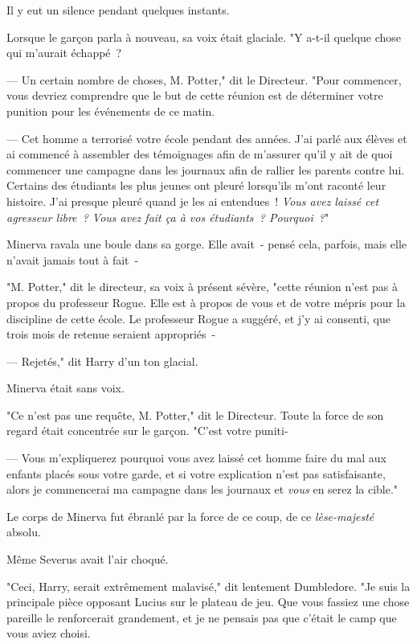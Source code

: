 Il y eut un silence pendant quelques instants.

Lorsque le garçon parla à nouveau, sa voix était glaciale. "Y a-t-il quelque chose qui m'aurait échappé~?

--- Un certain nombre de choses, M. Potter," dit le Directeur. "Pour commencer, vous devriez comprendre que le but de cette réunion est de déterminer votre punition pour les événements de ce matin.

--- Cet homme a terrorisé votre école pendant des années. J'ai parlé aux élèves et ai commencé à assembler des témoignages afin de m'assurer qu'il y ait de quoi commencer une campagne dans les journaux afin de rallier les parents contre lui. Certains des étudiants les plus jeunes ont pleuré lorsqu'ils m'ont raconté leur histoire. J'ai presque pleuré quand je les ai entendues~! \emph{Vous avez laissé cet agresseur libre~? Vous avez fait ça à vos étudiants~? Pourquoi~?}"

Minerva ravala une boule dans sa gorge. Elle avait~- pensé cela, parfois, mais elle n'avait jamais tout à fait~-

"M. Potter," dit le directeur, sa voix à présent sévère, "cette réunion n'est pas à propos du professeur Rogue. Elle est à propos de vous et de votre mépris pour la discipline de cette école. Le professeur Rogue a suggéré, et j'y ai consenti, que trois mois de retenue seraient appropriés~-

--- Rejetés," dit Harry d'un ton glacial.

Minerva était sans voix.

"Ce n'est pas une requête, M. Potter," dit le Directeur. Toute la force de son regard était concentrée sur le garçon. "C'est votre puniti-

--- Vous m'expliquerez pourquoi vous avez laissé cet homme faire du mal aux enfants placés sous votre garde, et si votre explication n'est pas satisfaisante, alors je commencerai ma campagne dans les journaux et \emph{vous} en serez la cible."

Le corps de Minerva fut ébranlé par la force de ce coup, de ce \emph{lèse-majesté} absolu.

Même Severus avait l'air choqué.

"Ceci, Harry, serait extrêmement malavisé," dit lentement Dumbledore. "Je suis la principale pièce opposant Lucius sur le plateau de jeu. Que vous fassiez une chose pareille le renforcerait grandement, et je ne pensais pas que c'était le camp que vous aviez choisi.

